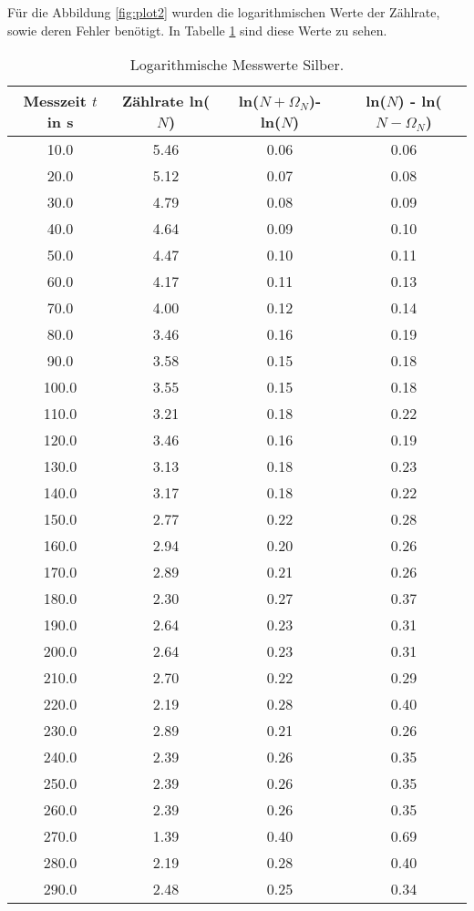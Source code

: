 Für die Abbildung \ref{fig:plot2} wurden die logarithmischen Werte der Zählrate, sowie deren Fehler benötigt.
In Tabelle \ref{tab:lnN2} sind diese Werte zu sehen.

\begin{table}
  \centering
  \caption{Logarithmische Messwerte Silber.}
  \label{tab:lnN2}
\begin{tabular}{c c c c}
  \toprule
  Messzeit $t$ in s & Zählrate ln($N$) & ln($N + \Omega_N$)- ln($N$) & ln($N$) - ln($N - \Omega_N$)\\
  \midrule
  10.0 & 5.46 & 0.06 & 0.06 \\
  20.0 & 5.12 & 0.07 & 0.08 \\
  30.0 & 4.79 & 0.08 & 0.09 \\
  40.0 & 4.64 & 0.09 & 0.10 \\
  50.0 & 4.47 & 0.10 & 0.11 \\
  60.0 & 4.17 & 0.11 & 0.13 \\
  70.0 & 4.00 & 0.12 & 0.14 \\
  80.0 & 3.46 & 0.16 & 0.19 \\
  90.0 & 3.58 & 0.15 & 0.18 \\
  100.0 & 3.55 & 0.15 & 0.18 \\
  110.0 & 3.21 & 0.18 & 0.22 \\
  120.0 & 3.46 & 0.16 & 0.19 \\
  130.0 & 3.13& 0.18 & 0.23 \\
  140.0 & 3.17 & 0.18 & 0.22 \\
  150.0 & 2.77 & 0.22 & 0.28 \\
  160.0 & 2.94 & 0.20 & 0.26 \\
  170.0 & 2.89 & 0.21 & 0.26 \\
  180.0 & 2.30 & 0.27 & 0.37 \\
  190.0 & 2.64 & 0.23 & 0.31 \\
  200.0 & 2.64 & 0.23 & 0.31 \\
  210.0 & 2.70 & 0.22 & 0.29 \\
  220.0 & 2.19 & 0.28 & 0.40 \\
  230.0 & 2.89 & 0.21 & 0.26 \\
  240.0 & 2.39 & 0.26 & 0.35 \\
  250.0 & 2.39 & 0.26 & 0.35 \\
  260.0 & 2.39 & 0.26 & 0.35 \\
  270.0 & 1.39 & 0.40 & 0.69 \\
  280.0 & 2.19 & 0.28 & 0.40 \\
  290.0 & 2.48 & 0.25 & 0.34 \\

\end{tabular}
\end{table}
